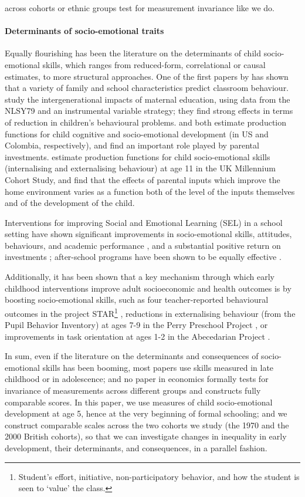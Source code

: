 across cohorts or ethnic groups test for measurement invariance like we do.

\paragraph{Determinants of socio-emotional traits} Equally flourishing has been the literature on the determinants of child socio-emotional skills, which ranges from reduced-form, correlational or causal estimates, to more structural approaches. One of the first papers by \citet{Segal2008} has shown that a variety of family and school characteristics predict classroom behaviour. \citet{Carneiro2013} study the intergenerational impacts of maternal education, using data from the NLSY79 and an instrumental variable strategy; they find strong effects in terms of reduction in children's behavioural problems. \citet{Cunha2010} and \citet{Attanasio2018a} both estimate production functions for child cognitive and socio-emotional development (in US and Colombia, respectively), and find an important role played by parental investments. \citet{Moroni2019} estimate production functions for child socio-emotional skills (internalising and externalising behaviour) at age 11 in the UK Millennium Cohort Study, and find that the effects of parental inputs which improve the home environment varies as a function both of the level of the inputs themselves and of the development of the child.

Interventions for improving Social and Emotional Learning (SEL) in a school setting have shown significant improvements in socio-emotional skills, attitudes, behaviours, and academic performance \citep{Durlak2011}, and a substantial positive return on investments \citep{Belfield2015}; after-school programs have been shown to be equally effective \citep{Durlak2010}.

Additionally, it has been shown that a key mechanism through which early childhood interventions improve adult socioeconomic and health outcomes is by boosting socio-emotional skills, such as four teacher-reported behavioural outcomes in the project STAR\footnote{Student's effort, initiative, non-participatory  behavior, and how the student is seen to `value' the class.} \citep{Chetty2011a}, reductions in externalising behaviour (from the Pupil Behavior Inventory) at ages 7-9 in the Perry Preschool Project \citep{Heckman2013,Conti2016a}, or improvements in task orientation at ages 1-2 in the Abecedarian Project \citep{Conti2016a}.

In sum, even if the literature on the determinants and consequences of socio-emotional skills has been booming, most papers use skills measured in late childhood or in adolescence; and no paper in economics formally tests for invariance of measurements across different groups and constructs fully comparable scores. In this paper, we use measures of child socio-emotional development at age 5, hence at the very beginning of formal schooling; and we construct comparable scales across the two cohorts we study (the 1970 and the 2000 British cohorts), so that we can investigate changes in inequality in early development, their determinants, and consequences, in a parallel fashion. 
